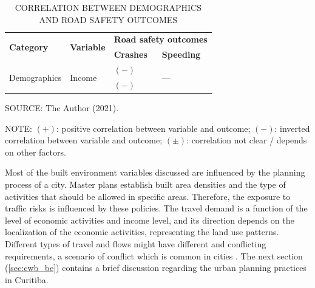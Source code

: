 \begin{table}[!hbtp]
    \footnotesize
    \captionsetup{justification=raggedright,
        singlelinecheck=false,
        font=footnotesize}
    \caption{CORRELATION BETWEEN DEMOGRAPHICS AND ROAD SAFETY OUTCOMES}
    \centering
    \begin{tabular}{llll}
        \hline
        \multirow{2}{*}{\textbf{Category}} & \multirow{2}{*}{\textbf{Variable}} & \multicolumn{2}{c}{\textbf{Road safety outcomes}} \\
         &  & \textbf{Crashes} & \textbf{Speeding} \\ \hline
        \multirow{2}{*}{Demographics} & \multirow{2}{*}{Income} & $(-)$ \textcite{Obelheiro2019} & \multirow{2}{*}{---} \\
         &  & $(-)$ \textcite{Marshall2017} &  \\ \hline
    \end{tabular}
    \label{tab:demographics}
    \par \vspace{2mm} \footnotesize \raggedright
    SOURCE: The Author (2021).
    \par \vspace{1mm} \footnotesize \raggedright
    NOTE: $(+)$: positive correlation between variable and outcome; $(-)$: inverted correlation between variable and outcome; $(\pm)$: correlation not clear / depends on other factors.
\end{table}








Most of the built environment variables discussed are influenced by the planning process of a city. Master plans establish built area densities and the type of activities that should be allowed in specific areas. Therefore, the exposure to traffic risks is influenced by these policies. The travel demand is a function of the level of economic activities and income level, and its direction depends on the localization of the economic activities, representing the land use patterns. Different types of travel and flows might have different and conflicting requirements, a scenario of conflict which is common in cities \cite{Tiwari}. The next section (\ref{sec:cwb_be}) contains a brief discussion regarding the urban planning practices in Curitiba.  

